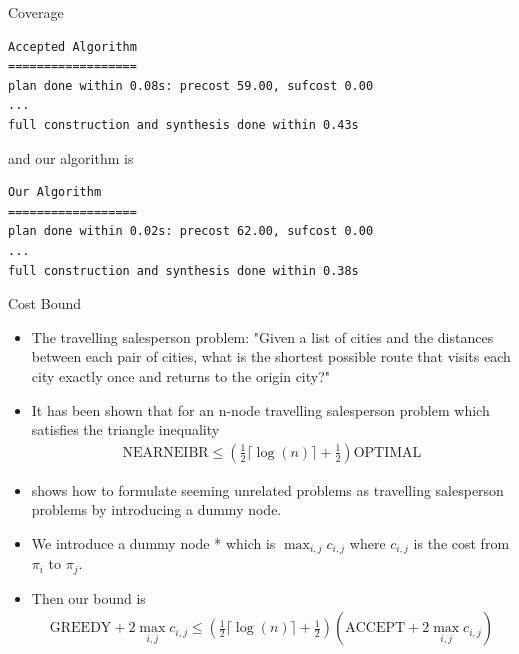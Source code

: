 \documentclass{beamer}
\begin{document}
\begin{frame}[fragile]{Coverage}
\begingroup
\fontsize{9pt}{12pt}\selectfont
\begin{lstlisting}
Accepted Algorithm
==================
plan done within 0.08s: precost 59.00, sufcost 0.00
...
full construction and synthesis done within 0.43s 
\end{lstlisting}
\endgroup
and our algorithm is 

\begingroup
\fontsize{9pt}{12pt}\selectfont
\begin{lstlisting}
Our Algorithm
==================
plan done within 0.02s: precost 62.00, sufcost 0.00
...
full construction and synthesis done within 0.38s 
\end{lstlisting}
\endgroup
\end{frame}

\begin{frame}{Cost Bound}
\begin{itemize}
\item The travelling salesperson problem: "Given a list of cities and the distances between each pair of cities, what is the shortest possible route that visits each city exactly once and returns to the origin city?"
\item It has been shown \cite{rosenkrantz74} that for an n-node travelling salesperson problem which satisfies the triangle inequality
\begin{align*}
\text{NEARNEIBR} \leq (\frac{1}{2} \lceil \log(n) \rceil + \frac{1}{2})\text{OPTIMAL}
\end{align*}
\item \cite{lenstra75} shows how to formulate seeming unrelated problems as travelling salesperson problems by introducing a dummy node.
\item We introduce a dummy node * which is $\max_{i,j} c_{i,j}$ where $c_{i,j}$ is the cost from $\pi_i$ to $\pi_j$.
\item Then our bound is  
\begin{align*}
\text{GREEDY} + 2\max_{i,j} c_{i,j} \leq (\frac{1}{2} \lceil \log(n) \rceil + \frac{1}{2}) (\text{ACCEPT} + 2 \max_{i,j} c_{i,j}) \\ 
\end{align*}
\end{itemize}
\end{frame}
\end{document}

